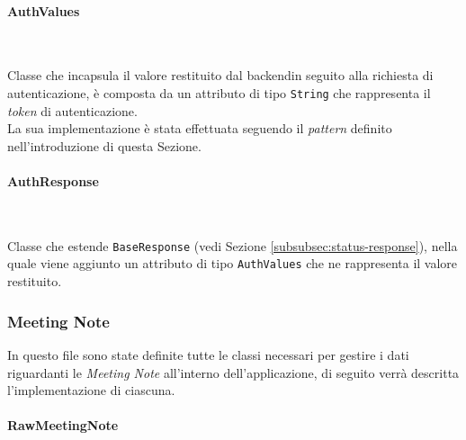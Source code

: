 \paragraph*{AuthValues} ~ \\
\label{par:auth-values}

\noindent Classe che incapsula il valore restituito dal \gls{backend}\glsoccur in seguito alla richiesta di autenticazione, è composta da un attributo di tipo \lstinline{String} che rappresenta il \emph{token} di autenticazione.\\
La sua implementazione è stata effettuata seguendo il \emph{pattern} definito nell'introduzione di questa Sezione.

\paragraph*{AuthResponse} ~ \\
\label{par:auth-response}

\noindent Classe che estende \lstinline{BaseResponse} (vedi Sezione \ref{subsubsec:status-response}), nella quale viene aggiunto un attributo di tipo \lstinline{AuthValues} che ne rappresenta il valore restituito.

\subsubsection*{Meeting Note}
\label{subsubsec:meeting-note}

In questo file sono state definite tutte le classi necessari per gestire i dati riguardanti le \emph{Meeting Note} all'interno dell'applicazione, di seguito verrà descritta l'implementazione di ciascuna.

\paragraph*{RawMeetingNote} ~ \\
\label{par:raw-meeting-note}

